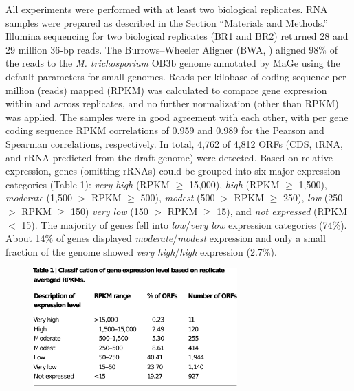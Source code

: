 All experiments were performed with at least two biological replicates.
RNA samples were prepared as described in the Section “Materials and Methods.”
Illumina sequencing for two biological replicates (BR1 and BR2) returned 28 and 29 million 36-bp reads.
The Burrows–Wheeler Aligner (BWA, \cite{li2009}) aligned 98\% of the reads to the \textit{M. trichosporium} OB3b genome annotated by MaGe \cite{vallenet2006} using the default parameters for small genomes.
Reads per kilobase of coding sequence per million (reads) mapped (RPKM) \cite{mortazavi2008} was calculated to compare gene expression within and across replicates, and no further normalization (other than RPKM) was applied.
The samples were in good agreement with each other, with per gene coding sequence RPKM correlations of 0.959 and 0.989 for the Pearson and Spearman correlations, respectively.
In total, 4,762 of 4,812 ORFs (CDS, tRNA, and rRNA predicted from the draft genome) were detected.
Based on relative expression, genes (omitting rRNAs) could be grouped into six major expression categories (Table 1): \textit{very high} (RPKM $\geq$ 15,000), \textit{high} (RPKM $\geq$ 1,500), \textit{moderate} (1,500 $>$ RPKM $\geq$ 500), \textit{modest} (500 $>$ RPKM $\geq$ 250), \textit{low} (250 $>$ RPKM $\geq$ 150) \textit{very low} (150 $>$ RPKM $\geq$ 15), and \textit{not expressed} (RPKM $<$ 15).
The majority of genes fell into \textit{low}/\textit{very low} expression categories (74\%).
About 14\% of genes displayed \textit{moderate}/\textit{modest} expression and only a small fraction of the genome showed \textit{very high}/\textit{high} expression (2.7\%).

\begin{figure}[H]
\centering
     \includegraphics[width=0.7\textwidth]{./tex/chapter1/figures/matsen_OB3b_table1_page--cropped.pdf}
     \begin{singlespace}
     \label{table:OB3b_1}
     \end{singlespace}
\end{figure}


